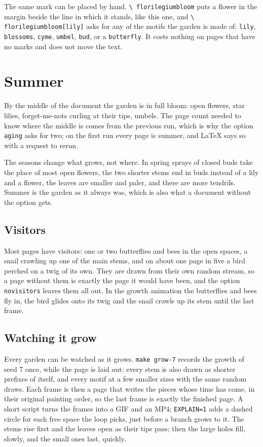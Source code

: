 \documentclass[11pt,a4paper]{article}
\newcommand\code[1]{\texttt{\small #1}}
\begin{document}
The same mark can be placed by hand. \code{\textbackslash
florilegiumbloom} puts a flower
in the margin beside the line in which it stands, like this
one\florilegiumbloom, and \code{\textbackslash
florilegiumbloom[lily]} asks for any of the
motifs the garden is made of: \code{lily}, \code{blossoms},
\code{cyme}, \code{umbel},
\code{bud}, or a \code{butterfly}. It costs nothing on pages that
have no marks and does
not move the text.

\section{Summer}

By the middle of the document the garden is in full bloom: open
flowers, star lilies,
forget-me-nots curling at their tips, umbels. The page count needed
to know where the
middle is comes from the previous run, which is why the option
\code{aging} asks for two;
on the first run every page is summer, and LaTeX says so with a
request to rerun.

The seasons change what grows, not where. In spring sprays of closed
buds take the place of
most open flowers, the two shorter stems end in buds instead of a
lily and a flower, the
leaves are smaller and paler, and there are more tendrils. Summer is
the garden as it
always was, which is also what a document without the option gets.

\subsection{Visitors}

Most pages have visitors: one or two butterflies and bees in the open
spaces, a snail
crawling up one of the main stems, and on about one page in five a
bird perched on a twig
of its own. They are drawn from their own random stream, so a page
without them is
exactly the page it would have been, and the option \code{novisitors}
leaves them all out.
In the growth animation the butterflies and bees fly in, the bird
glides onto its twig
and the snail crawls up its stem until the last frame.

\subsection{Watching it grow}

Every garden can be watched as it grows. \code{make grow-7} records
the growth of seed 7
once, while the page is laid out: every stem is also drawn as shorter
prefixes of itself,
and every motif at a few smaller sizes with the same random draws.
Each frame is then a
page that writes the pieces whose time has come, in their original
painting order, so the
last frame is exactly the finished page. A short script turns the
frames into a GIF and an
MP4; \code{EXPLAIN=1} adds a dashed circle for each free space the
loop picks, just before
a branch grows to it. The stems rise first and the leaves open as
their tips pass; then
the large holes fill, slowly, and the small ones last, quickly.
\end{document}
